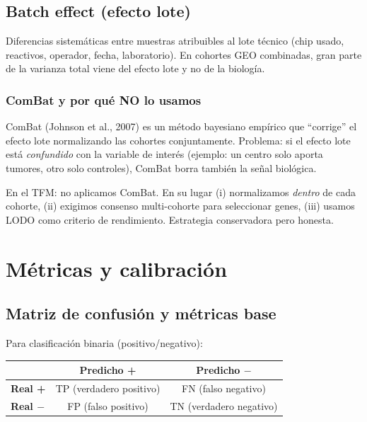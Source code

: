 \documentclass[11pt, a4paper]{article}
\begin{document}
\subsection{Batch effect (efecto lote)}

Diferencias sistem\'aticas entre muestras atribuibles al lote t\'ecnico
(chip usado, reactivos, operador, fecha, laboratorio). En cohortes GEO
combinadas, gran parte de la varianza total viene del efecto lote y no
de la biolog\'ia.

\subsubsection*{ComBat y por qu\'e NO lo usamos}
ComBat (Johnson et al., 2007) es un m\'etodo bayesiano emp\'irico que
``corrige'' el efecto lote normalizando las cohortes conjuntamente.
Problema: si el efecto lote est\'a \emph{confundido} con la variable de
inter\'es (ejemplo: un centro solo aporta tumores, otro solo controles),
ComBat borra tambi\'en la se\~nal biol\'ogica.

En el TFM: no aplicamos ComBat. En su lugar (i) normalizamos
\emph{dentro} de cada cohorte, (ii) exigimos consenso multi-cohorte
para seleccionar genes, (iii) usamos LODO como criterio de rendimiento.
Estrategia conservadora pero honesta.

\section{M\'etricas y calibraci\'on}

\subsection{Matriz de confusi\'on y m\'etricas base}

Para clasificaci\'on binaria (positivo/negativo):

\begin{center}
\small
\begin{tabular}{lcc}
\toprule
 & \textbf{Predicho +} & \textbf{Predicho $-$} \\
\midrule
\textbf{Real +} & TP (verdadero positivo) & FN (falso negativo) \\
\textbf{Real $-$} & FP (falso positivo) & TN (verdadero negativo) \\
\bottomrule
\end{tabular}
\end{center}
\end{document}
